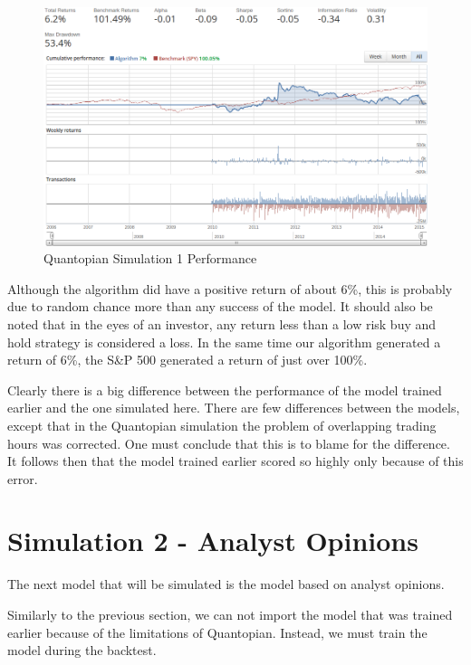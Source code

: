 \documentclass{report}
\begin{document}
\begin{figure}[H]
	\caption{Quantopian Simulation 1 Performance}
	\vspace{8pt}
	\centerline{\includegraphics[scale=0.4]{vis/quantopian_related.png}}
	
	\label{fig:quantopian-1}
\end{figure}

Although the algorithm did have a positive return of about 6\%, this is probably due to random chance more than any success of the model. It should also be noted that in the eyes of an investor, any return less than a low risk buy and hold strategy is considered a loss. In the same time our algorithm generated a return of 6\%, the S\&P 500 generated a return of just over 100\%.

Clearly there is a big difference between the performance of the model trained earlier and the one simulated here. There are few differences between the models, except that in the Quantopian simulation the problem of overlapping trading hours was corrected. One must conclude that this is to blame for the difference. It follows then that the model trained earlier scored so highly only because of this error.

\section{Simulation 2 - Analyst Opinions}

The next model that will be simulated is the model based on analyst opinions.

Similarly to the previous section, we can not import the model that was trained earlier because of the limitations of Quantopian. Instead, we must train the model during the backtest. 
\end{document}
